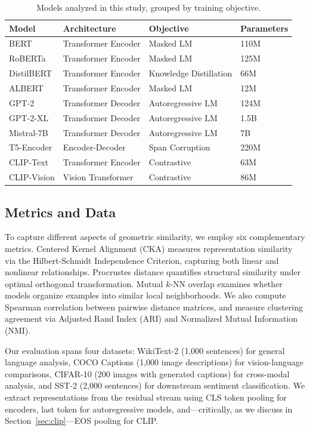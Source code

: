 \documentclass{article}
\begin{document}
\begin{table}[t]
\centering
\caption{Models analyzed in this study, grouped by training objective.}
\label{tab:models}
\small
\begin{tabular}{@{}llll@{}}
\toprule
\textbf{Model} & \textbf{Architecture} & \textbf{Objective} & \textbf{Parameters} \\
\midrule
BERT & Transformer Encoder & Masked LM & 110M \\
RoBERTa & Transformer Encoder & Masked LM & 125M \\
DistilBERT & Transformer Encoder & Knowledge Distillation & 66M \\
ALBERT & Transformer Encoder & Masked LM & 12M \\
\midrule
GPT-2 & Transformer Decoder & Autoregressive LM & 124M \\
GPT-2-XL & Transformer Decoder & Autoregressive LM & 1.5B \\
Mistral-7B & Transformer Decoder & Autoregressive LM & 7B \\
\midrule
T5-Encoder & Encoder-Decoder & Span Corruption & 220M \\
CLIP-Text & Transformer Encoder & Contrastive & 63M \\
CLIP-Vision & Vision Transformer & Contrastive & 86M \\
\bottomrule
\end{tabular}
\end{table}

\subsection{Metrics and Data}

To capture different aspects of geometric similarity, we employ six complementary metrics. Centered Kernel Alignment (CKA) measures representation similarity via the Hilbert-Schmidt Independence Criterion, capturing both linear and nonlinear relationships. Procrustes distance quantifies structural similarity under optimal orthogonal transformation. Mutual $k$-NN overlap examines whether models organize examples into similar local neighborhoods. We also compute Spearman correlation between pairwise distance matrices, and measure clustering agreement via Adjusted Rand Index (ARI) and Normalized Mutual Information (NMI).

Our evaluation spans four datasets: WikiText-2 (1,000 sentences) for general language analysis, COCO Captions (1,000 image descriptions) for vision-language comparisons, CIFAR-10 (200 images with generated captions) for cross-modal analysis, and SST-2 (2,000 sentences) for downstream sentiment classification. We extract representations from the residual stream using CLS token pooling for encoders, last token for autoregressive models, and---critically, as we discuss in Section~\ref{sec:clip}---EOS pooling for CLIP.
\end{document}
